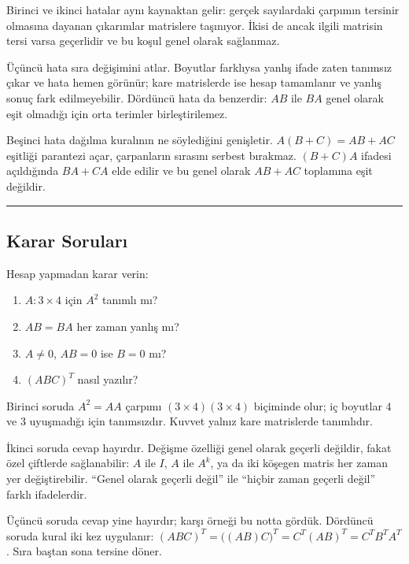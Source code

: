 \documentclass[
  letterpaper,
  DIV=11,
  numbers=noendperiod]{scrartcl}
\providecommand{\tightlist}{%
  \setlength{\itemsep}{0pt}\setlength{\parskip}{0pt}}
\begin{document}
Birinci ve ikinci hatalar aynı kaynaktan gelir: gerçek sayılardaki
çarpımın tersinir olmasına dayanan çıkarımlar matrislere taşınıyor.
İkisi de ancak ilgili matrisin tersi varsa geçerlidir ve bu koşul genel
olarak sağlanmaz.

Üçüncü hata sıra değişimini atlar. Boyutlar farklıysa yanlış ifade zaten
tanımsız çıkar ve hata hemen görünür; kare matrislerde ise hesap
tamamlanır ve yanlış sonuç fark edilmeyebilir. Dördüncü hata da
benzerdir: \(AB\) ile \(BA\) genel olarak eşit olmadığı için orta
terimler birleştirilemez.

Beşinci hata dağılma kuralının ne söylediğini genişletir.
\(A(B+C)=AB+AC\) eşitliği parantezi açar, çarpanların sırasını serbest
bırakmaz. \((B+C)A\) ifadesi açıldığında \(BA+CA\) elde edilir ve bu
genel olarak \(AB+AC\) toplamına eşit değildir.

\begin{center}\rule{0.5\linewidth}{0.5pt}\end{center}

\subsection{Karar Soruları}\label{karar-sorularux131}

Hesap yapmadan karar verin:

\begin{enumerate}
\def\labelenumi{\arabic{enumi}.}
\tightlist
\item
  \(A:3\times4\) için \(A^2\) tanımlı mı?
\item
  \(AB=BA\) her zaman yanlış mı?
\item
  \(A\ne0\), \(AB=0\) ise \(B=0\) mı?
\item
  \((ABC)^T\) nasıl yazılır?
\end{enumerate}

Birinci soruda \(A^2=AA\) çarpımı \((3\times4)(3\times4)\) biçiminde
olur; iç boyutlar \(4\) ve \(3\) uyuşmadığı için tanımsızdır. Kuvvet
yalnız kare matrislerde tanımlıdır.

İkinci soruda cevap hayırdır. Değişme özelliği genel olarak geçerli
değildir, fakat özel çiftlerde sağlanabilir: \(A\) ile \(I\), \(A\) ile
\(A^k\), ya da iki köşegen matris her zaman yer değiştirebilir. ``Genel
olarak geçerli değil'' ile ``hiçbir zaman geçerli değil'' farklı
ifadelerdir.

Üçüncü soruda cevap yine hayırdır; karşı örneği bu notta gördük.
Dördüncü soruda kural iki kez uygulanır:
\((ABC)^T=\bigl((AB)C\bigr)^T=C^T(AB)^T=C^TB^TA^T\). Sıra baştan sona
tersine döner.
\end{document}
